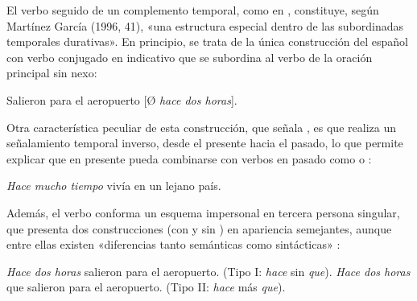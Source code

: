 \begin{recuadro}
El verbo  seguido de un complemento temporal, como en , constituye, según Martínez García (1996,
41), «una
estructura especial dentro de las subordinadas temporales durativas». En
principio, se trata de la única construcción del español con verbo conjugado en
indicativo que se subordina al verbo de la oración principal sin nexo:

\begin{exe}
  \ex\label{ex:13-hace1} Salieron para el aeropuerto [Ø \textit{hace dos
      horas}].
\end{exe}

Otra característica peculiar de esta construcción, que señala , es que realiza un señalamiento temporal inverso, desde el presente hacia
el pasado, lo que permite explicar que  en presente pueda
combinarse con verbos en pasado como   o
 :

\begin{exe}
  \ex\label{ex:13-hace2} \textit{Hace mucho tiempo} vivía en un lejano país.
\end{exe}

Además, el verbo  conforma un esquema impersonal en tercera persona
singular, que presenta dos construcciones (con y sin ) en apariencia
semejantes, aunque entre ellas existen «diferencias tanto semánticas como
sintácticas» \parencite[334]{ditullio2014}:

\begin{exe}
  \ex\label{ex:13-hace-I} \textit{Hace dos horas} salieron para el aeropuerto.
      (Tipo I: \textit{hace} sin \textit{que}).
  \ex\label{ex:13-hace-II} \textit{Hace dos horas} que salieron para el
      aeropuerto. (Tipo II: \textit{hace} más \textit{que}).
\end{exe}


\end{recuadro}
